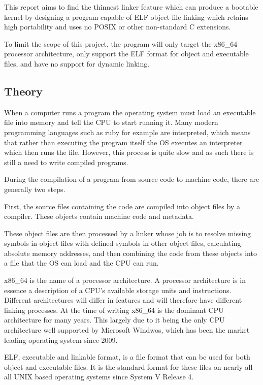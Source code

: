 \documentclass{article}
\begin{document}
This report aims to find the thinnest linker feature which can produce a bootable kernel by designing a program capable of ELF object file linking which retains high portability and uses no POSIX or other non-standard C extensions.

To limit the scope of this project, the program will only target the x86\_64 processor architecture, only support the ELF format for object and executable files, and have no support for dynamic linking.

\subsection{Theory}

When a computer runs a program the operating system must load an executable file into memory and tell the CPU to start running it. Many modern programming languages such as ruby for example are interpreted, which means that rather than executing the program itself the OS executes an interpreter which then runs the file.\autocite{SYSVSPEC} However, this process is quite slow and as such there is still a need to write compiled programs.

During the compilation of a program from source code to machine code, there are generally two steps.\autocite{LinkersAndLoaders}

First, the source files containing the code are compiled into object files by a compiler. These objects contain machine code and metadata.\autocite{LinkersAndLoaders}

These object files are then processed by a linker whose job is to resolve missing symbols in object files with defined symbols in other object files, calculating absolute memory addresses, and then combining the code from these objects into a file that the OS can load and the CPU can run.\autocite{SYSVSPEC}

x86\_64 is the name of a processor architecture. A processor architecture is in essence a description of a CPU's available storage units and instructions. Different architectures will differ in features and will therefore have different linking processes. \autocite{comparch} At the time of writing x86\_64 is the dominant CPU architecture for many years. This largely due to it being the only CPU architecture well supported by Microsoft Windwos, which has been the market leading operating system since 2009.\autocite{archstat}

ELF, executable and linkable format, is a file format that can be used for both object and executable files.\autocite{ELFSpec} It is the standard format for these files on nearly all all UNIX based operating systems since System V Release 4.\autocite{SYSVSPEC}
\end{document}
